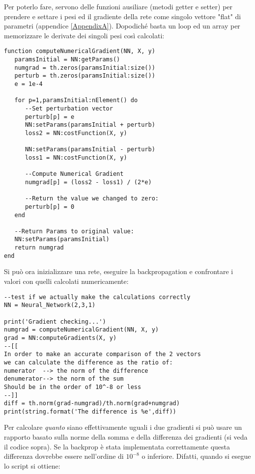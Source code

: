 Per poterlo fare, servono delle funzioni ausiliare (metodi getter e setter) per prendere e settare i pesi ed il gradiente della rete come singolo vettore "flat" di parametri (appendice \ref{AppendixA}). Dopodiché basta un loop ed un array per memorizzare le derivate dei singoli pesi così calcolati:

\begin{lstlisting}[language={[5.2]Lua}]
function computeNumericalGradient(NN, X, y)
   paramsInitial = NN:getParams()
   numgrad = th.zeros(paramsInitial:size())
   perturb = th.zeros(paramsInitial:size())
   e = 1e-4

   for p=1,paramsInitial:nElement() do
      --Set perturbation vector
      perturb[p] = e
      NN:setParams(paramsInitial + perturb)
      loss2 = NN:costFunction(X, y)

      NN:setParams(paramsInitial - perturb)
      loss1 = NN:costFunction(X, y)

      --Compute Numerical Gradient
      numgrad[p] = (loss2 - loss1) / (2*e)

      --Return the value we changed to zero:
      perturb[p] = 0
   end

   --Return Params to original value:
   NN:setParams(paramsInitial)
   return numgrad
end
\end{lstlisting}
Si può ora inizializzare una rete, eseguire la backpropagation e confrontare i valori con quelli calcolati numericamente:
\begin{lstlisting}[language={[5.2]Lua}]
--test if we actually make the calculations correctly
NN = Neural_Network(2,3,1)

print('Gradient checking...')
numgrad = computeNumericalGradient(NN, X, y)
grad = NN:computeGradients(X, y)
--[[
In order to make an accurate comparison of the 2 vectors
we can calculate the difference as the ratio of:
numerator  --> the norm of the difference
denumerator--> the norm of the sum
Should be in the order of 10^-8 or less
--]]
diff = th.norm(grad-numgrad)/th.norm(grad+numgrad)
print(string.format('The difference is %e',diff))
\end{lstlisting}

Per calcolare \emph{quanto} siano effettivamente uguali i due gradienti si può usare un rapporto basato sulla norme della somma e della differenza dei gradienti (si veda il codice sopra). Se la backprop è stata implementata correttamente questa differenza dovrebbe essere nell'ordine di $10^{-8}$ o inferiore. Difatti, quando si esegue lo script si ottiene:

